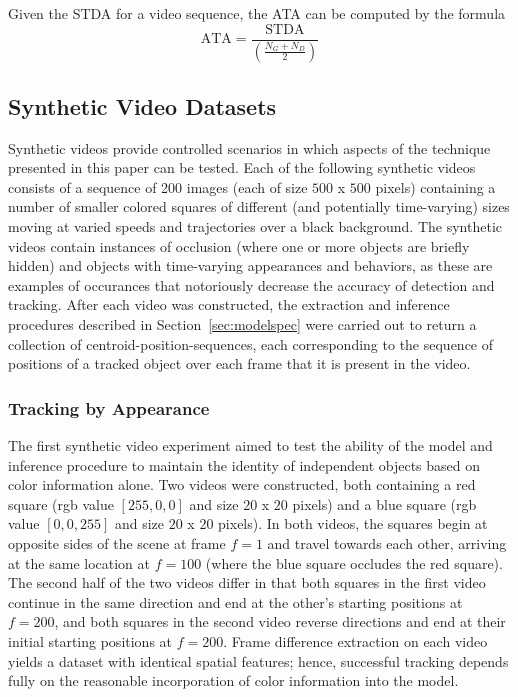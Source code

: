 \documentclass[smallcondensed, final]{svjour3}
\begin{document}
Given the STDA for a video sequence, the ATA can be computed by the formula
\begin{equation}
\text{ATA} = \frac{\text{STDA}}{\left( \frac{N_{G} + N_{D}}{2} \right)}
\end{equation}



\subsection{Synthetic Video Datasets}
\label{sec:syntheticvideos}

Synthetic videos provide controlled scenarios in which aspects of the technique presented in this paper can be tested. Each of the following synthetic videos consists of a sequence of 200 images (each of size $500$ x $500$ pixels) containing a number of smaller colored squares of different (and potentially time-varying) sizes moving at varied speeds and trajectories over a black background. The synthetic videos contain instances of occlusion (where one or more objects are briefly hidden) and objects with time-varying appearances and behaviors, as these are examples of occurances that notoriously decrease the accuracy of detection and tracking. After each video was constructed, the extraction and inference procedures described in Section~\ref{sec:modelspec} were carried out to return a collection of centroid-position-sequences, each corresponding to the sequence of positions of a tracked object over each frame that it is present in the video.


\subsubsection{Tracking by Appearance}

The first synthetic video experiment aimed to test the ability of the model and inference procedure to maintain the identity of independent objects based on color information alone. Two videos were constructed, both containing a red square (rgb value $[255,0,0]$ and size $20$ x $20$ pixels) and a blue square (rgb value $[0,0,255]$ and size $20$ x $20$ pixels). In both videos, the squares begin at opposite sides of the scene at frame $f=1$ and travel towards each other, arriving at the same location at $f=100$ (where the blue square occludes the red square). The second half of the two videos differ in that both squares in the first video continue in the same direction and end at the other's starting positions at $f=200$, and both squares in the second video reverse directions and end at their initial starting positions at $f=200$. Frame difference extraction on each video yields a dataset with identical spatial features; hence, successful tracking depends fully on the reasonable incorporation of color information into the model.
\end{document}
